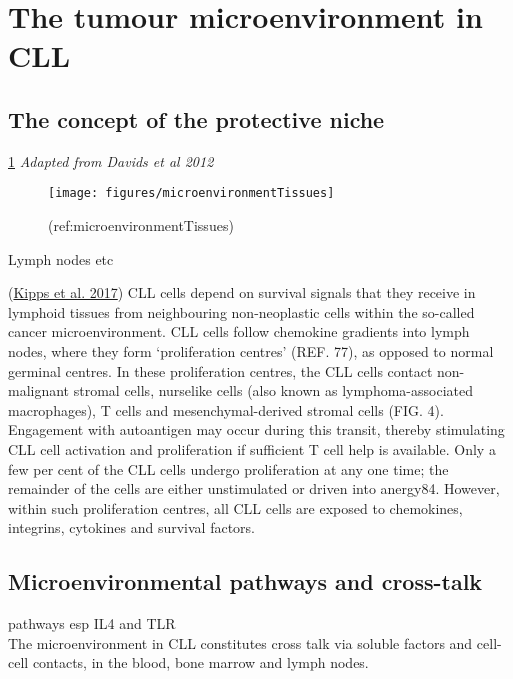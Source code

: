 \documentclass[11pt, a4paper, twosided]{book}
\begin{document}
\hypertarget{the-tumour-microenvironment-in-cll}{%
\section{The tumour microenvironment in CLL}\label{the-tumour-microenvironment-in-cll}}

\hypertarget{the-concept-of-the-protective-niche}{%
\subsection{The concept of the protective niche}\label{the-concept-of-the-protective-niche}}

\ref{fig:microenvironmentTissues} \emph{Adapted from Davids et al 2012}
\begin{figure}

{\centering \texttt{[image: figures/microenvironmentTissues]} 

}

\caption{(ref:microenvironmentTissues)}\label{fig:microenvironmentTissues}
\end{figure}
Lymph nodes etc

(\protect\hyperlink{ref-Kipps2017}{Kipps et al. 2017})
CLL cells depend on survival signals that they receive in lymphoid tissues from neighbouring non-neoplastic cells within the so-called cancer microenvironment. CLL cells follow chemokine gradients into lymph nodes, where they form `proliferation centres' (REF. 77), as opposed to normal germinal centres. In these proliferation centres, the CLL cells contact non- malignant stromal cells, nurselike cells (also known as lymphoma-associated macrophages), T cells and mesenchymal-derived stromal cells (FIG. 4). Engagement with autoantigen may occur during this transit, thereby stimulating CLL cell activation and proliferation if sufficient T cell help is available. Only a few per cent of the CLL cells undergo proliferation at any one time; the remainder of the cells are either unstimulated or driven into anergy84. However, within such proliferation centres, all CLL cells are exposed to chemokines, integrins, cytokines and survival factors.

\hypertarget{intro-ME-pathways}{%
\subsection{Microenvironmental pathways and cross-talk}\label{intro-ME-pathways}}

pathways esp IL4 and TLR\\
The microenvironment in CLL constitutes cross talk via soluble factors and cell-cell contacts, in the blood, bone marrow and lymph nodes.
\end{document}
